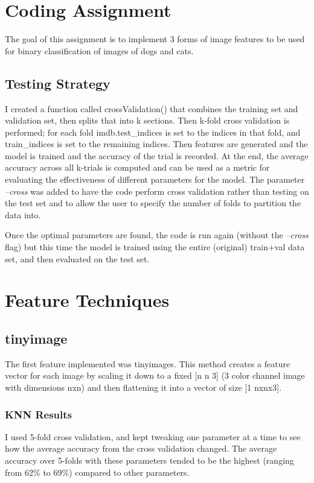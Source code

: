 \documentclass[fleqn]{article}
\begin{document}
\section{Coding Assignment}
The goal of this assignment is to implement 3 forms of image features to be used for binary classification of images of dogs and cats.

\subsection{Testing Strategy}
I created a function called crossValidation() that combines the training set and validation set, then splits that into k sections.  Then k-fold cross validation is performed; for each fold imdb.test\_indices is set to the indices in that fold, and train\_indices is set to the remaining indices.  Then features are generated and the model is trained and the accuracy of the trial is recorded.  At the end, the average accuracy across all k-trials is computed and can be used as a metric for evaluating the effectiveness of different parameters for the model.  The parameter \textit{--cross}  was added to have the code perform cross validation rather than testing on the test set and to allow the user to specify the number of folds to partition the data into.

Once the optimal parameters are found, the code is run again (without the \textit{--cross} flag) but this time the model is trained using the entire (original) train+val data set, and then evaluated on the test set. 

\section{Feature Techniques}



\subsection{tinyimage}
The first feature implemented was tinyimages.  This method creates a feature vector for each image by scaling it down to a fixed [n n 3] (3 color channel image with dimensions nxn) and then flattening it into a vector of size [1 nxnx3].

\subsubsection{KNN Results}
I used 5-fold cross validation, and kept tweaking one parameter at a time to see how the average accuracy from the cross validation changed.  The average accuracy over 5-folds with these parameters tended to be the highest (ranging from 62\% to 69\%) compared to other parameters.
\end{document}
